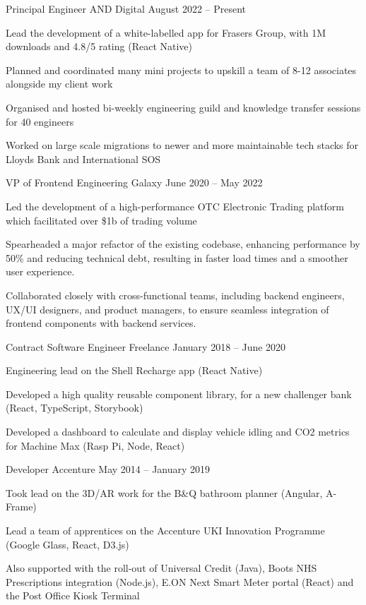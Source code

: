 \documentclass[]{resume-format}
\begin{document}
\begin{cventries}
    \cventry
    { Principal Engineer }
    { AND Digital }
    {}
    { August 2022 – Present }
    {\begin{cvitems}
        \item { Lead the development of a white-labelled app for Frasers Group, with 1M downloads and 4.8/5 rating (React Native) }
        \item { Planned and coordinated many mini projects to upskill a team of 8-12 associates alongside my client work }
        \item { Organised and hosted bi-weekly engineering guild and knowledge transfer sessions for 40 engineers }
        \item { Worked on large scale migrations to newer and more maintainable tech stacks for Lloyds Bank and International SOS }
    \end{cvitems}}
    \cventry
    { VP of Frontend Engineering }
    { Galaxy }
    {}
    { June 2020 – May 2022 }
    {\begin{cvitems}
        \item { Led the development of a high-performance OTC Electronic Trading platform which facilitated over \$1b of trading volume }
        \item { Spearheaded a major refactor of the existing codebase, enhancing performance by 50\% and reducing technical debt, resulting in faster load times and a smoother user experience. }
        \item { Collaborated closely with cross-functional teams, including backend engineers, UX/UI designers, and product managers, to ensure seamless integration of frontend components with backend services. }
    \end{cvitems}}
    \cventry
    { Contract Software Engineer }
    { Freelance }
    {}
    { January 2018 – June 2020 }
    {\begin{cvitems}
        \item { Engineering lead on the Shell Recharge app (React Native) }
        \item { Developed a high quality reusable component library, for a new challenger bank (React, TypeScript, Storybook) }
        \item { Developed a dashboard to calculate and display vehicle idling and CO2 metrics for Machine Max (Rasp Pi, Node, React) }
    \end{cvitems}}
    \cventry
    { Developer }
    { Accenture }
    {}
    { May 2014 – January 2019 }
    {\begin{cvitems}
        \item { Took lead on the 3D/AR work for the B\&Q bathroom planner (Angular, A-Frame) }
        \item { Lead a team of apprentices on the Accenture UKI Innovation Programme (Google Glass, React, D3.js) }
        \item { Also supported with the roll-out of Universal Credit (Java), Boots NHS Prescriptions integration (Node.js), E.ON Next Smart Meter portal (React) and the Post Office Kiosk Terminal }
    \end{cvitems}}
\end{cventries}
\end{document}
